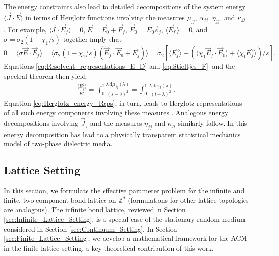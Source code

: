 \documentclass{cmslatex}
\renewcommand{\d}{\text{d}}
\begin{document}
The energy constraints also lead to detailed decompositions of the
system energy $\langle\vec{J}\cdot\vec{E}\rangle$ in terms of Herglotz functions
involving the measures $\mu_{jj}$, $\alpha_{jj}$, $\eta_{jj}$, and $\kappa_{jj}$
\cite{Murphy:JMP:063506,Murphy_Thermo_Stat_Mech}. For 
example, $\langle\vec{J}\cdot\vec{E}_f\rangle=0$, $\vec{E}=\vec{E}_0+\vec{E}_f$, 
$\vec{E}_0=E_0\vec{e}_j$, $\langle\vec{E}_f\,\rangle=0$, and $\sigma=\sigma_2(1-\chi_1/s)$ together
imply that $0=\langle\sigma\vec{E}\cdot\vec{E}_f\rangle=\langle\sigma_2(1-\chi_1/s)(\vec{E}_f\cdot\vec{E}_0+E_f^2)\rangle 
=\sigma_2\left[\langle E_f^2\rangle- (\langle\chi_1\vec{E}_f\cdot\vec{E}_0\rangle+\langle\chi_1E_f^2\rangle)/s\right].$
Equations \eqref{eq:Resolvent_representations_E_D} and
\eqref{eq:Stieltjes_F}, and the spectral theorem \cite{Reed-1980} then
yield \cite{Murphy:JMP:063506}  
%
\begin{align}\label{eq:Herglotz_energy_Reps}
 \frac{\langle E_f^2\rangle}{E_0^2}=\int_0^1 \frac{\lambda\,\d\mu_{jj}(\lambda)}{(s-\lambda)^2}
           =\int_0^1 \frac{\lambda\,\d\alpha_{jj}(\lambda)}{(t-\lambda)^2}\,. 
\end{align}
%
Equation \eqref{eq:Herglotz_energy_Reps}, in turn, leads to Herglotz
representations of all such energy components involving
these measures \cite{Murphy_Thermo_Stat_Mech}. Analogous energy
decompositions involving $\vec{J}_f$ and the measures $\eta_{jj}$ and
$\kappa_{jj}$ similarly follow. In \cite{Murphy_Thermo_Stat_Mech} this
energy decomposition has lead to a physically transparent statistical
mechanics model of two-phase dielectric media.


\subsection{Lattice Setting}
\label{sec:Lattice_Setting}
%
In this section, we formulate the effective parameter problem for the
infinite and finite, two-component bond lattice on $\mathbb{Z}^d$
(formulations for other lattice topologies are analogous). The
infinite bond lattice, reviewed in Section
\ref{sec:Infinite_Lattice_Setting}, is a special case of the
stationary random medium considered in Section
\ref{sec:Continuum_Setting}. In Section
\ref{sec:Finite_Lattice_Setting}, we develop a mathematical framework
for the ACM in the finite lattice setting, a key theoretical
contribution of this work. 
\end{document}
